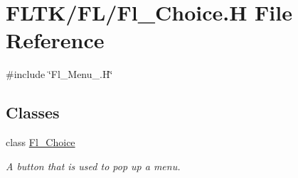 \hypertarget{_fl___choice_8_h}{}\section{F\+L\+T\+K/\+F\+L/\+Fl\+\_\+\+Choice.H File Reference}
\label{_fl___choice_8_h}
{\ttfamily \#include \char`\"{}Fl\+\_\+\+Menu\+\_\+.\+H\char`\"{}}\newline
\subsection*{Classes}
\begin{DoxyCompactItemize}
\item 
class \hyperlink{class_fl___choice}{Fl\+\_\+\+Choice}
\begin{DoxyCompactList}\small\item\em A button that is used to pop up a menu. \end{DoxyCompactList}\end{DoxyCompactItemize}
